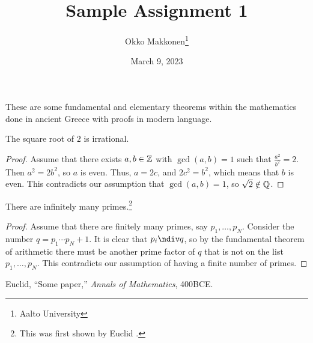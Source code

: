 \documentclass{myassignment}
\title{Sample Assignment 1}
\author{Okko Makkonen\thanks{Aalto University}}
\date{March 9, 2023}
\begin{document}
\maketitle

These are some fundamental and elementary theorems within the mathematics done in ancient Greece with proofs in modern language.
    

\begin{claim}
The square root of $2$ is irrational.
\end{claim}

\begin{proof}
Assume that there exists $a, b \in \mathbb{Z}$ with $\gcd(a, b) = 1$ such that $\frac{a^2}{b^2} = 2$. Then $a^2 = 2b^2$, so $a$ is even. Thus, $a = 2c$, and $2c^2 = b^2$, which means that $b$ is even. This contradicts our assumption that $\gcd(a, b) = 1$, so $\sqrt{2} \notin \mathbb{Q}$.
\end{proof}


\begin{claim}
There are infinitely many primes.\footnote{This was first shown by Euclid \cite{euclid400BCE}.}
\end{claim}

\begin{proof}
Assume that there are finitely many primes, say $p_1, \dots, p_N$. Consider the number $q = p_1 \cdots p_N + 1$. It is clear that $p_i \ndiv q$, so by the fundamental theorem of arithmetic there must be another prime factor of $q$ that is not on the list $p_1, \dots, p_N$. This contradicts our assumption of having a finite number of primes.
\end{proof}

\begin{thebibliography}{1}
Euclid, ``Some paper,'' {\em Annals of Mathematics}, 400BCE.
\end{thebibliography}
\end{document}
